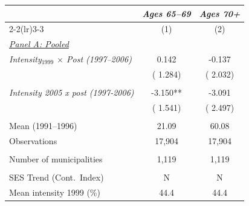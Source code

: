 \begin{tabular}{lcc} \hline \hline
& \multicolumn{1}{c}{\textit{Ages 65--69}} & \multicolumn{1}{c}{\textit{Ages 70+}} \\ 
\cmidrule(lr){2-2}\cmidrule(lr){3-3}
& \multicolumn{1}{c}{(1)} & \multicolumn{1}{c}{(2)} \\ \toprule
\underline{\textit{Panel A: Pooled}}  \\ 
\textit{Intensity$_{1999}$ $\times$ Post (1997--2006)} &        0.142 &       -0.137 \\ 
 & (       1.284) & (       2.032) \\ 
  & & \\ 
\textit{Intensity 2005 x post (1997-2006)} &       -3.150** &       -3.091 \\ 
 & (       1.541) & (       2.497) \\ 
  & & \\ 
Mean (1991--1996) &        21.09 &        60.08 \\ 
Observations &       17,904 &       17,904 \\ 
  & & \\ 
Number of municipalities &        1,119 &        1,119 \\ 
  & & \\ 
SES Trend (Cont.\ Index) & N & N \\ 
Mean intensity 1999 (\%) &   44.4 &   44.4 \\ 
\bottomrule
\end{tabular}
